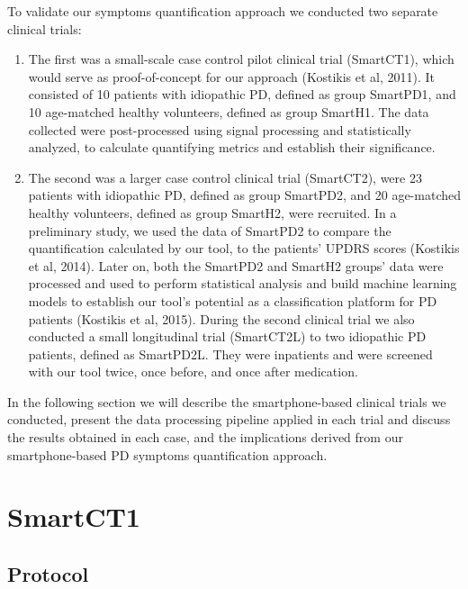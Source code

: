 To validate our symptoms quantification approach we conducted two separate clinical trials: 

\begin{enumerate}
\item The first was a small-scale case control pilot clinical trial (\gls{SmartCT1}), which would serve as proof-of-concept for our approach (Kostikis et al, 2011). It consisted of 10 patients with idiopathic \gls{PD}, defined as group \gls{SmartPD1}, and 10 age-matched healthy volunteers, defined as group \gls{SmartH1}. The data collected were post-processed using signal processing and statistically analyzed, to calculate quantifying metrics and establish their significance. 
\item The second was a larger case control clinical trial (\gls{SmartCT2}), were 23 patients with idiopathic \gls{PD}, defined as group \gls{SmartPD2}, and 20 age-matched healthy volunteers, defined as group \gls{SmartH2}, were recruited. In a preliminary study, we used the data of \gls{SmartPD2} to compare the quantification calculated by our tool, to the patients' \gls{UPDRS} scores (Kostikis et al, 2014). Later on, both the \gls{SmartPD2} and \gls{SmartH2} groups' data were processed and used to perform statistical analysis and build machine learning models to establish our tool's potential as a classification platform for \gls{PD} patients (Kostikis et al, 2015). During the second clinical trial we also conducted a small longitudinal trial (\gls{SmartCT2L}) to two idiopathic \gls{PD} patients, defined as \gls{SmartPD2L}. They were inpatients and were screened with our tool twice, once before, and once after medication. 
\end{enumerate}

In the following section we will describe the smartphone-based clinical trials we conducted, present the data processing pipeline applied in each trial and discuss the results obtained in each case, and the implications derived from our smartphone-based PD symptoms quantification approach. 

\section{SmartCT1}
\label{sec:SmartCT1}

\subsection{Protocol}
\label{subsec:SmartCT1Protocol}

